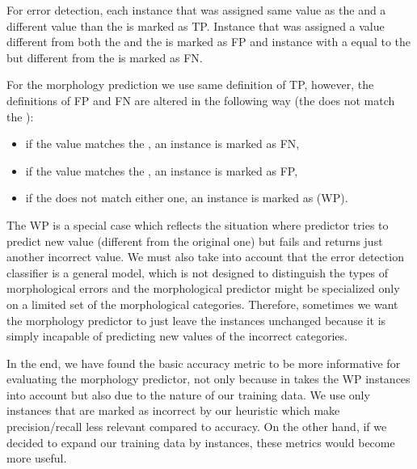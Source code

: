 
For error detection, each instance that was assigned same value as the 
and a different value than the  is marked as TP. Instance
that was assigned a value different from both the  and the 
is marked as FP and instance with a  equal to the 
but different from the  is marked as FN.

For the morphology prediction we use same definition of TP, however, the definitions
of FP and FN are altered in the following way (the 
does not match the ):
\begin{itemize}
\item if the  value matches the , an instance is marked as FN,
\item if the  value matches the , an instance is marked as FP,
\item if the  does not match either one, an instance is marked as  (WP).
\end{itemize}

The WP is a special case which reflects the situation where predictor tries to predict new value (different
from the original one) but fails and returns just another incorrect value. We must also take into account
that the error detection classifier is a general model, which is not designed to distinguish
the types of morphological errors and the morphological predictor might be specialized only on a limited
set of the morphological categories. Therefore, sometimes we want the morphology predictor to just leave the 
instances unchanged because it is simply incapable of predicting new values of the incorrect categories.

In the end, we have found the basic accuracy metric to be more informative for evaluating the morphology predictor,
not only because in takes the WP instances into account but also due to the nature of our training data. We use only instances
that are marked as incorrect by our heuristic
which make precision/recall less relevant compared to accuracy.
On the other hand, if we decided to expand our training data
by  instances, these metrics would become more useful. 

